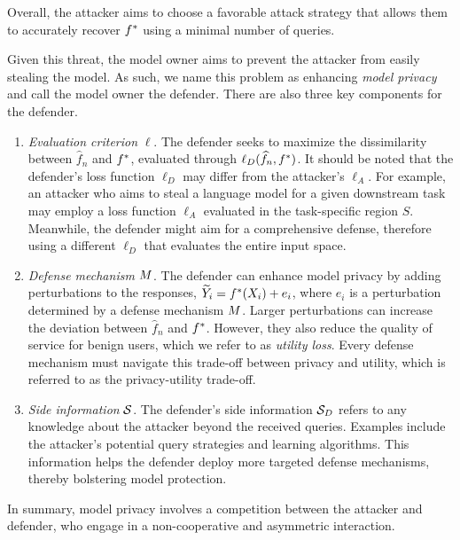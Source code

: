     Overall, the attacker aims to choose a favorable attack strategy that allows them to accurately recover $f^*$ using a minimal number of queries.

    Given this threat, the model owner aims to prevent the attacker from easily stealing the model. As such, we name this problem as enhancing \textit{model privacy} and call the model owner the defender. There are also three key components for the defender.
    \begin{enumerate}
        \item \textit{ Evaluation criterion} $\ell$. The defender seeks to maximize the dissimilarity between $\hat{f}_n$ and $f^*$, evaluated through $\ell_D(\widehat{f}_n, f^*)$. It should be noted that the defender's loss function $\ell_D$ may differ from the attacker's $\ell_A$. For example, an attacker who aims to steal a language model for a given downstream task may employ a loss function $\ell_A$ evaluated in the task-specific region $S$. Meanwhile, the defender might aim for a comprehensive defense, therefore using a different $\ell_D$ that evaluates the entire input space.

        \item \textit{ Defense mechanism} $M$. 
        The defender can enhance model privacy by adding perturbations to the responses, $\widetilde{Y}_i=f^*(X_i)+e_i$, where $e_i$ is a perturbation determined by a defense mechanism $M$. Larger perturbations can increase the deviation between $\hat{f}_n$ and $f^*$. However, they also reduce the quality of service for benign users, which we refer to as \textit{utility loss}. Every defense mechanism must navigate this trade-off between privacy and utility, which is referred to as the privacy-utility trade-off.

        \item \textit{ Side information} $\mathcal{S}$. The defender's side information $\mathcal{S}_D$ refers to any knowledge about the attacker beyond the received queries. Examples include the attacker's potential query strategies and learning algorithms. This information helps the defender deploy more targeted defense mechanisms, thereby bolstering model protection.
    \end{enumerate}

    In summary, model privacy involves a competition between the attacker and defender, who engage in a non-cooperative and asymmetric interaction.


